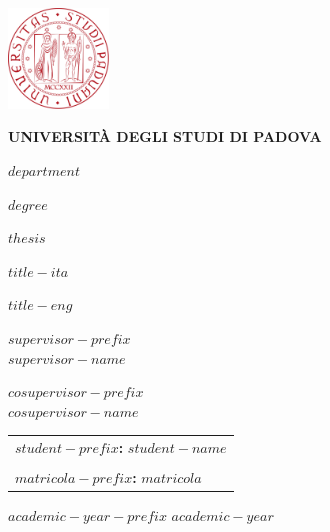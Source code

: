 \begin{center}
    \includegraphics[width=0.2\textwidth]{figures/unipd.pdf} \\ %
    \vspace{0.5cm}
    
    \textbf{UNIVERSITÀ DEGLI STUDI DI PADOVA} \\
    \vspace{0.5cm}
    
    \textbf{$department$}\\
    \vspace{0.5cm}
    
    \textbf{$degree$}\\
    \vspace{1cm}
    
    \textbf{$thesis$}\\
    \vspace{2cm}
    
    \textbf{$title-ita$} \\
    \vspace{1cm}
    
    \textbf{$title-eng$} \\
    \vspace{2.5cm}
    
    \begin{flushleft}
        \textbf{$supervisor-prefix$}\\
        $supervisor-name$  \\
        \vspace{0.5cm}
        
        \textbf{$cosupervisor-prefix$}\\
        $cosupervisor-name$ \\
    \end{flushleft}
    
    \vfill
    
    \begin{flushright}
    \begin{tabular}{@{}l@{}}
    \textbf{$student-prefix$:} $student-name$ \\ \\
    \textbf{$matricola-prefix$:} $matricola$ \\
    \end{tabular}
    \end{flushright}
    
    \vspace{1 cm}
    \begin{center}
        \textbf{$academic-year-prefix$}\; \textbf{$academic-year$}
    \end{center}
\end{center}

\vfill